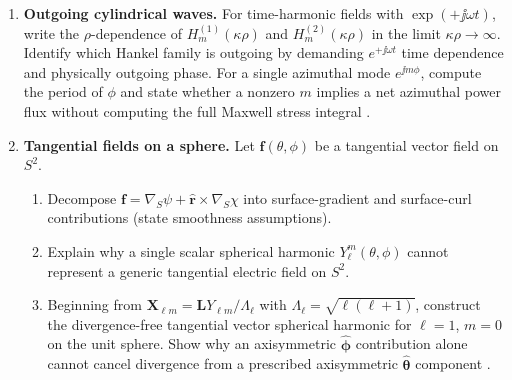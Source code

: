 \begin{enumerate}
\item \textbf{Outgoing cylindrical waves.}
For time-harmonic fields with $\exp(+\jj\omega t)$, write the $\rho$-dependence of $H_m^{(1)}(\kappa\rho)$ and $H_m^{(2)}(\kappa\rho)$ in the limit $\kappa\rho\to\infty$. Identify which Hankel family is outgoing by demanding $e^{+\jj\omega t}$ time dependence and physically outgoing phase. For a single azimuthal mode $e^{\jj m\phi}$, compute the period of $\phi$ and state whether a nonzero $m$ implies a net azimuthal power flux without computing the full Maxwell stress integral \cite{stratton1941,harrington2001}.

\item \textbf{Tangential fields on a sphere.}
Let $\mathbf{f}(\theta,\phi)$ be a tangential vector field on $S^2$.
\begin{enumerate}[label=(\alph*)]
\item Decompose $\mathbf{f}=\nabla_S\psi+\hat{\mathbf{r}}\times\nabla_S\chi$ into surface-gradient and surface-curl contributions (state smoothness assumptions).
\item Explain why a single scalar spherical harmonic $Y_\ell^m(\theta,\phi)$ cannot represent a generic tangential electric field on $S^2$.
\item Beginning from $\mathbf{X}_{\ell m}=\mathbf{L}Y_{\ell m}/\Lambda_{\ell}$ with $\Lambda_{\ell}=\sqrt{\ell(\ell+1)}$, construct the divergence-free tangential vector spherical harmonic for $\ell=1$, $m=0$ on the unit sphere. Show why an axisymmetric $\hat{\boldsymbol{\phi}}$ contribution alone cannot cancel divergence from a prescribed axisymmetric $\hat{\boldsymbol\theta}$ component \cite{stratton1941,hansen1988}.
\end{enumerate}


\end{enumerate}
